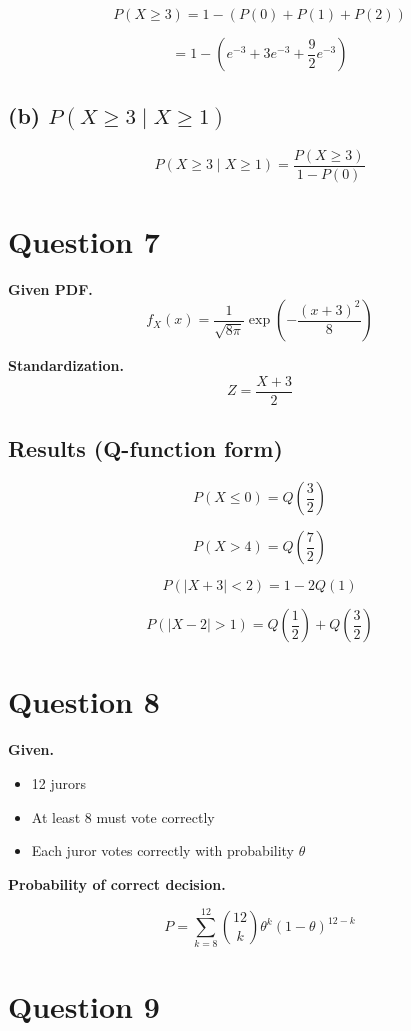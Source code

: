 \documentclass[12pt]{article}
\begin{document}
\[
P(X \ge 3) = 1 - (P(0) + P(1) + P(2))
\]

\[
= 1 - \left(e^{-3} + 3e^{-3} + \frac{9}{2}e^{-3}\right)
\]

\subsection*{(b) $P(X \ge 3 \mid X \ge 1)$}

\[
P(X \ge 3 \mid X \ge 1) = \frac{P(X \ge 3)}{1 - P(0)}
\]

\section*{Question 7}

\textbf{Given PDF.}
\[
f_X(x) = \frac{1}{\sqrt{8\pi}} \exp\left(-\frac{(x+3)^2}{8}\right)
\]

\textbf{Standardization.}
\[
Z = \frac{X+3}{2}
\]

\subsection*{Results (Q-function form)}

\[
P(X \le 0) = Q\left(\frac{3}{2}\right)
\]

\[
P(X > 4) = Q\left(\frac{7}{2}\right)
\]

\[
P(|X+3|<2) = 1 - 2Q(1)
\]

\[
P(|X-2|>1) = Q\left(\frac{1}{2}\right) + Q\left(\frac{3}{2}\right)
\]

\section*{Question 8}

\textbf{Given.}
\begin{itemize}
\item 12 jurors
\item At least 8 must vote correctly
\item Each juror votes correctly with probability $\theta$
\end{itemize}

\textbf{Probability of correct decision.}

\[
P = \sum_{k=8}^{12} \binom{12}{k} \theta^k (1-\theta)^{12-k}
\]

\section*{Question 9}
\end{document}
